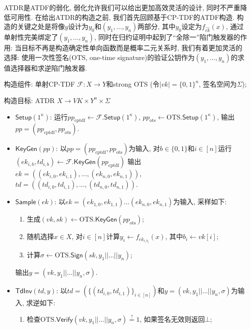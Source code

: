 ATDR是ATDF的弱化, 弱化允许我们可以给出更加高效灵活的设计, 同时不严重降低可用性. 
在给出ATDR的构造之前, 我们首先回顾基于CP-TDF的ATDF构造. 
构造的关键之处是将像$y$设计为$y_0$和$(y_1, \dots, y_n)$两部分, 其中$y_0$设定为$f_{\hat{ek}}(x)$, 
通过单射性完美绑定了$(y_1, \dots, y_n)$, 同时在归约证明中起到了``全除一''陷门触发器的作用: 
当目标不再是构造确定性单向函数而是概率二元关系时, 我们有着更加灵活的选择: 
使用一次性签名(OTS, one-time signature)的验证公钥作为$(y_1, \dots, y_n)$的求值选择器和求逆陷门触发器. 


\begin{construction}
\begin{trivlist}
\item 构造组件: 单射CP-TDF $\mathcal{F}: X \rightarrow Y$和strong OTS (令$|vk| = \{0,1\}^n$, 签名空间为$\Sigma$);

\item 构造目标: ATDR $X \rightarrow VK \times Y^n \times \Sigma$
\begin{itemize}
\item $\mathsf{Setup}(1^\kappa)$: 运行$pp_\text{cptdf} \leftarrow \mathcal{F}.\mathsf{Setup}(1^\kappa)$, 
	$pp_\text{ots} \leftarrow \text{OTS}.\mathsf{Setup}(1^\kappa)$, 输出$pp = (pp_\text{cptdf}, pp_\text{ots})$. 

\item $\mathsf{KeyGen}(pp)$: 以$pp = (pp_\text{cptdf}, pp_\text{ots})$为输入, 
	对$b \in \{0,1\}$和$i \in [n]$运行$(ek_{i,b}, td_{i,b}) \leftarrow \mathcal{F}.\mathsf{KeyGen}(pp_\text{cptdf})$ 
	输出$ek = ((ek_{i,0}, ek_{i,1}), \dots, (ek_{n,0}, ek_{n,1}))$, 
	$td = ((td_{i,0}, td_{i,1}), \dots, (td_{n,0}, td_{n,1}))$.

\item $\mathsf{Sample}(ek)$: 以$ek = (ek_{1,0}, ek_{1,1}) \dots (ek_{n,0}, ek_{n,1})$为输入, 采样如下:
	\begin{enumerate}  
		\item 生成$(vk, sk) \leftarrow \text{OTS}.\mathsf{KeyGen}(pp_\text{ots})$; 
		\item 随机选择$x \in X$, 对$i \in [n]$计算$y_i \leftarrow f_{ek_{i,b_i}}(x)$, 其中$b_i \leftarrow vk[i]$; 
		\item 计算$\sigma \leftarrow \text{OTS}.\mathsf{Sign}(sk, y_1||\dots||y_n)$;
	\end{enumerate}
输出$y = (vk, y_1||\dots||y_n, \sigma)$.

\item $\mathsf{TdInv}(td, y)$: 以$td = (\{(td_{i,0}, td_{i,1})\}_{i \in [n]})$和$y = (vk, y_1||\dots||y_n, \sigma)$为输入, 求逆如下: 
\begin{enumerate}
    \item 检查$\text{OTS}.\mathsf{Verify}(vk, y_1||\dots||y_n, \sigma) \stackrel{?}{=}1$, 
    	如果签名无效则返回$\bot$; 


\end{enumerate}
\end{itemize}
\end{trivlist}
\end{construction}
